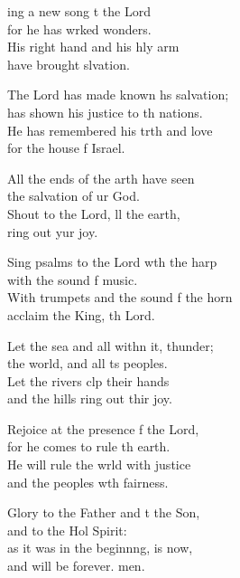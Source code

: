 \settowidth{\versewidth}{With trumpets and the sound of the horn *}
\begin{psalmverse}%
  \begin{patverse}
ing a new song t the Lord\Med\\
for he has wrked wonders.\\
His right hand and his hly arm\Med\\
have brought slvation.

The Lord has made known h\pointup{\i}s salvation;\Med\\
has shown his justice to th nations.\\
He has remembered his trth and love\Med\\
for the house f Israel.

All the ends of the arth have seen\Med\\
the salvation of ur God.\\
Shout to the Lord, ll the earth,\Med\\
ring out yur joy.

Sing psalms to the Lord w\pointup{\i}th the harp\Med\\
with the sound f music.\\
With trumpets and the sound f the horn\Med\\
acclaim the King, th Lord.

Let the sea and all with\pointup{\i}n it, thunder;\Med\\
the world, and all \pointup{\i}ts peoples.\\
Let the rivers clp their hands\Med\\
and the hills ring out thir joy.

Rejoice at the presence f the Lord,\Med\\
for he comes to rule th earth.\\
He will rule the wrld with justice\Med\\
and the peoples w\pointup{\i}th fairness.

Glory to the Father and t the Son,\Med\\
and to the Hol Spirit:\\
as it was in the beginn\pointup{\i}ng, is now,\Med\\
and will be forever. men. 
  \end{patverse}
\end{psalmverse}
